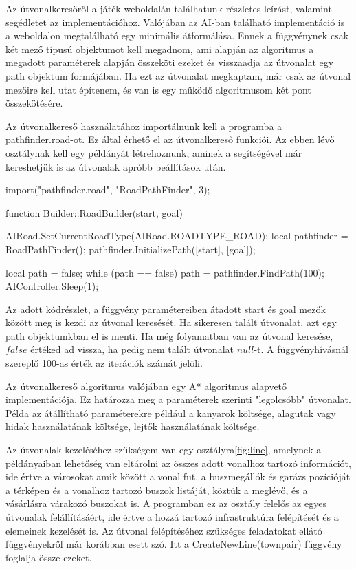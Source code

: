 Az útvonalkeresőről a játék weboldalán találhatunk részletes leírást, valamint segédletet az implementációhoz. Valójában az AI-ban található implementáció is a weboldalon megtalálható egy minimális átformálása. Ennek a függvénynek csak két mező típusú objektumot kell megadnom, ami alapján az algoritmus a megadott paraméterek alapján összeköti ezeket és visszaadja az útvonalat egy path objektum formájában. Ha ezt az útvonalat megkaptam, már csak az útvonal mezőire kell utat építenem, és van is egy működő algoritmusom két pont összekötésére.

Az útvonalkereső használatához importálnunk kell a programba a pathfinder.road-ot. Ez által érhető el az útvonalkereső funkciói. Az ebben lévő osztálynak kell egy példányát létrehoznunk, aminek a segítségével már kereshetjük is az útvonalak apróbb beállítások után.

\begin{cpp}
import("pathfinder.road", "RoadPathFinder", 3);

function Builder::RoadBuilder(start, goal) {
  AIRoad.SetCurrentRoadType(AIRoad.ROADTYPE_ROAD);
  local pathfinder = RoadPathFinder();
  pathfinder.InitializePath([start], [goal]);
  
  local path = false;
  while (path == false) {
    path = pathfinder.FindPath(100);
    AIController.Sleep(1);
  }
}
\end{cpp}

Az adott kódrészlet, a függvény paramétereiben átadott start és goal mezők között meg is kezdi az útvonal keresését. Ha sikeresen talált útvonalat, azt egy path objektumkban el is menti. Ha még folyamatban van az útvonal keresése, $false$ értéked ad vissza, ha pedig nem talált útvonalat $null$-t. A függvényhívásnál szereplő 100-as érték az iterációk számát jelöli.

Az útvonalkereső algoritmus valójában egy A* algoritmus alapvető implementációja. Ez határozza meg a paraméterek szerinti "legolcsóbb" útvonalat. Példa az átállítható paraméterekre például a kanyarok költsége, alagutak vagy hidak használatának költsége, lejtők használatának költsége.


Az útvonalak kezeléséhez szükségem van egy osztályra\ref{fig:line}, amelynek a példányaiban lehetőség van eltárolni az összes adott vonalhoz tartozó információt, ide értve a városokat amik között a vonal fut, a buszmegállók és garázs pozícióját a térképen és a vonalhoz tartozó buszok listáját, köztük a meglévő, és a vásárlásra várakozó buszokat is. A programban ez az osztály felelős az egyes útvonalak felállításáért, ide értve a hozzá tartozó infrastruktúra felépítését és a elemeinek kezelését is. Az útvonal felépítéséhez szükséges feladatokat ellátó függvényekről már korábban esett szó. Itt a CreateNewLine(townpair) függvény foglalja össze ezeket.

